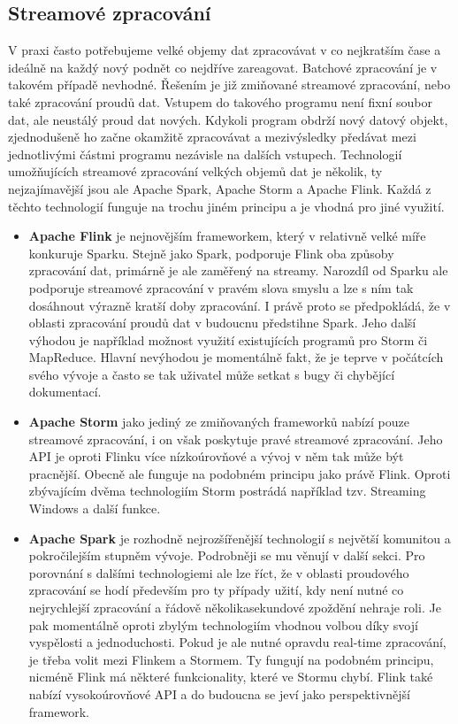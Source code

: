 \documentclass[thesis=B,czech]{FITthesis}[2012/06/26]
\begin{document}
\subsection{Streamové zpracování}
	V praxi často potřebujeme velké objemy dat zpracovávat v co nejkratším čase a ideálně na každý nový podnět co nejdříve zareagovat. Batchové zpracování je v takovém případě nevhodné. Řešením je již zmiňované streamové zpracování, nebo také zpracování proudů dat. Vstupem do takového programu není fixní soubor dat, ale neustálý proud dat nových. Kdykoli program obdrží nový datový objekt, zjednodušeně ho začne okamžitě zpracovávat a mezivýsledky předávat mezi jednotlivými částmi programu nezávisle na dalších vstupech. Technologií umožňujících streamové zpracování velkých objemů dat je několik, ty nejzajímavější jsou ale Apache Spark, Apache Storm a Apache Flink. Každá z těchto technologií funguje na trochu jiném principu a je vhodná pro jiné využití. 
	
\begin{itemize}
\item \textbf{Apache Flink} je nejnovějším frameworkem, který v relativně velké míře konkuruje Sparku. Stejně jako Spark, podporuje Flink oba způsoby zpracování dat, primárně je ale zaměřený na streamy. Narozdíl od Sparku ale podporuje streamové zpracování v pravém slova smyslu a lze s ním tak dosáhnout výrazně kratší doby zpracování\cite{streaming-benchmark}. I právě proto se předpokládá, že v oblasti zpracování proudů dat v budoucnu předstihne Spark\cite{flink-future}. Jeho další výhodou je například možnost využití existujících programů pro Storm či MapReduce. Hlavní nevýhodou je momentálně fakt, že je teprve v počátcích svého vývoje a často se tak uživatel může setkat s bugy či chybějící dokumentací. 
	
\item \textbf{Apache Storm} jako jediný ze zmiňovaných frameworků nabízí pouze streamové zpracování, i on však poskytuje pravé streamové zpracování. Jeho API je oproti Flinku více nízkoúrovňové a vývoj v něm tak může být pracnější. Obecně ale funguje na podobném principu jako právě Flink. Oproti zbývajícím dvěma technologiím Storm postrádá například tzv. Streaming Windows a další funkce\cite{so-flink-storm}.
	
\item \textbf{Apache Spark} je rozhodně nejrozšířenější technologií s největší komunitou a pokročilejším stupněm vývoje. Podrobněji se mu věnují v další sekci. Pro porovnání s dalšími technologiemi ale lze říct, že v oblasti proudového zpracování se hodí především pro ty případy užití, kdy není nutné co nejrychlejší zpracování a řádově několikasekundové zpoždění nehraje roli. Je pak momentálně oproti zbylým technologiím vhodnou volbou díky svojí vyspělosti a jednoduchosti. Pokud je ale nutné opravdu real-time zpracování, je třeba volit mezi Flinkem a Stormem. Ty fungují na podobném principu, nicméně Flink má některé funkcionality, které ve Stormu chybí\cite{so-flink-storm}. Flink také nabízí vysokoúrovňové API a do budoucna se jeví jako perspektivnější framework. 
\end{itemize}		
	
\end{document}

